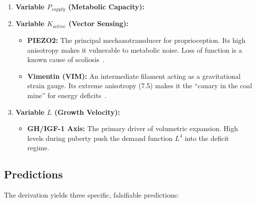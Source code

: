 \begin{enumerate}
    \item \textbf{Variable $P_{supply}$ (Metabolic Capacity):}

    \item \textbf{Variable $K_{active}$ (Vector Sensing):}
    \begin{itemize}
        \item \textbf{PIEZO2:} The principal mechanotransducer for proprioception. Its high anisotropy makes it vulnerable to metabolic noise. Loss of function is a known cause of scoliosis~\cite{antman2005nonlinear}.
        \item \textbf{Vimentin (VIM):} An intermediate filament acting as a gravitational strain gauge. Its extreme anisotropy (7.5) makes it the ``canary in the coal mine'' for energy deficits~\cite{wuest2025vim}.
    \end{itemize}

    \item \textbf{Variable $\dot{L}$ (Growth Velocity):}
    \begin{itemize}
        \item \textbf{GH/IGF-1 Axis:} The primary driver of volumetric expansion. High levels during puberty push the demand function $L^4$ into the deficit regime.
    \end{itemize}
\end{enumerate}

\subsection{Predictions}

The derivation yields three specific, falsifiable predictions:

